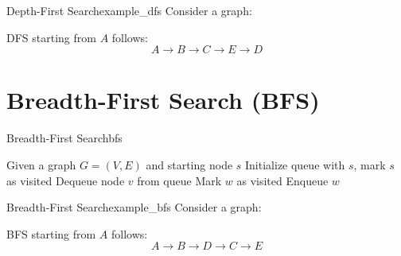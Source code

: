 \begin{exampletcb}
    {Depth-First Search}{example_dfs}
    Consider a graph:
    \begin{center}
    \end{center}

    DFS starting from $A$ follows:
    \[
    A \rightarrow B \rightarrow C \rightarrow E \rightarrow D
    \]
\end{exampletcb}


\section{Breadth-First Search (BFS)}
\begin{algorithmtcb}
    {Breadth-First Search}{bfs}
    \begin{algorithmic}
        \State Given a graph $G = (V, E)$ and starting node $s$
        \State Initialize queue with $s$, mark $s$ as visited
            \State Dequeue node $v$ from queue
                \State Mark $w$ as visited
                \State Enqueue $w$
            \EndFor
        \EndWhile
    \end{algorithmic}
\end{algorithmtcb}

\begin{exampletcb}
    {Breadth-First Search}{example_bfs}
    Consider a graph:
\begin{center}
\end{center}
    BFS starting from $A$ follows:
    \[
    A \rightarrow B \rightarrow D \rightarrow C \rightarrow E
    \]
\end{exampletcb}
